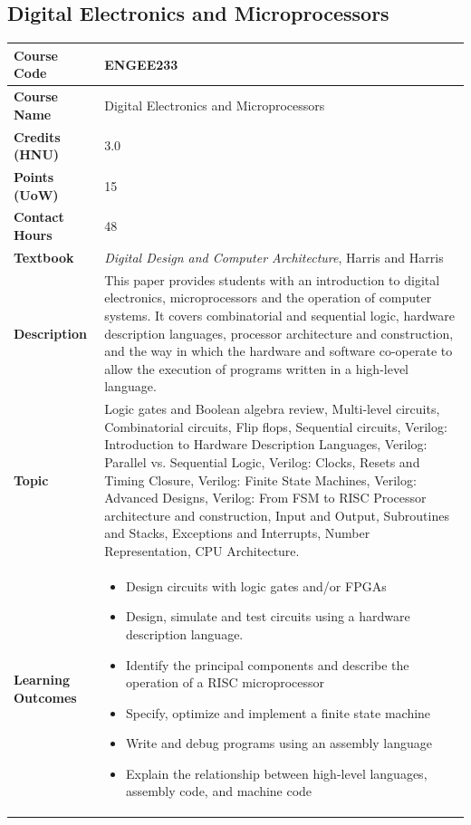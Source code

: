 \documentclass{article}
\begin{document}
\subsection[ENGEE233 Digital Electronics and Microprocessors]{Digital Electronics and Microprocessors}
\renewcommand{\arraystretch}{1.5} %
\begin{longtable}{|p{3cm}|p{10cm}|}
\hline
\textbf{Course Code} & ENGEE233 \\
\hline
\textbf{Course Name} & Digital Electronics and Microprocessors \\
\hline
\textbf{Credits (HNU)} & 3.0 \\
\hline
\textbf{Points (UoW)} & 15 \\
\hline
\textbf{Contact Hours} & 48 \\
\hline
\textbf{Textbook} & \emph{Digital Design and Computer Architecture}, Harris and Harris \\
\hline
\textbf{Description} & This paper provides students with an introduction to digital electronics, microprocessors and the operation of computer systems. It covers combinatorial and sequential logic, hardware description languages, processor architecture and construction, and the way in which the hardware and software co-operate to allow the execution of programs written in a high-level language.\\
\hline
\textbf{Topic} & Logic gates and Boolean algebra review, 
Multi-level circuits, 
Combinatorial circuits, 
Flip flops, 
Sequential circuits,  
Verilog: Introduction to Hardware Description Languages, 
Verilog: Parallel vs. Sequential Logic, 
Verilog: Clocks, Resets and Timing Closure, 
Verilog: Finite State Machines, 
Verilog: Advanced Designs, 
Verilog: From FSM to RISC Processor architecture and construction, 
Input and Output, 
Subroutines and Stacks, 
Exceptions and Interrupts, 
Number Representation, 
CPU Architecture. \\
\hline
\textbf{Learning Outcomes} & 
    \begin{itemize}
        \item Design circuits with logic gates and/or FPGAs
        \item Design, simulate and test circuits using a hardware description language.
        \item Identify the principal components and describe the operation of a RISC microprocessor
        \item Specify, optimize and implement a finite state machine
        \item Write and debug programs using an assembly language
        \item Explain the relationship between high-level languages, assembly code, and machine code
    \end{itemize} \\
\hline
\end{longtable}
\end{document}
